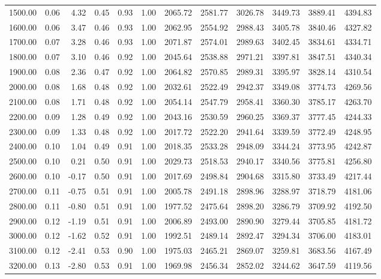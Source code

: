 \begin{table}[ht]
\begin{tabular}{rrrrrrrrrrrr}
  1500.00 & 0.06 & 4.32 & 0.45 & 0.93 & 1.00 & 2065.72 & 2581.77 & 3026.78 & 3449.73 & 3889.41 & 4394.83 \\ 
  1600.00 & 0.06 & 3.47 & 0.46 & 0.93 & 1.00 & 2062.95 & 2554.92 & 2988.43 & 3405.78 & 3840.46 & 4327.82 \\ 
  1700.00 & 0.07 & 3.28 & 0.46 & 0.93 & 1.00 & 2071.87 & 2574.01 & 2989.63 & 3402.45 & 3834.61 & 4334.71 \\ 
  1800.00 & 0.07 & 3.10 & 0.46 & 0.92 & 1.00 & 2045.64 & 2538.88 & 2971.21 & 3397.81 & 3847.51 & 4340.34 \\ 
  1900.00 & 0.08 & 2.36 & 0.47 & 0.92 & 1.00 & 2064.82 & 2570.85 & 2989.31 & 3395.97 & 3828.14 & 4310.54 \\ 
  2000.00 & 0.08 & 1.68 & 0.48 & 0.92 & 1.00 & 2032.61 & 2522.49 & 2942.37 & 3349.08 & 3774.73 & 4269.56 \\ 
  2100.00 & 0.08 & 1.71 & 0.48 & 0.92 & 1.00 & 2054.14 & 2547.79 & 2958.41 & 3360.30 & 3785.17 & 4263.70 \\ 
  2200.00 & 0.09 & 1.28 & 0.49 & 0.92 & 1.00 & 2043.16 & 2530.59 & 2960.25 & 3369.37 & 3777.45 & 4244.33 \\ 
  2300.00 & 0.09 & 1.33 & 0.48 & 0.92 & 1.00 & 2017.72 & 2522.20 & 2941.64 & 3339.59 & 3772.49 & 4248.95 \\ 
  2400.00 & 0.10 & 1.04 & 0.49 & 0.91 & 1.00 & 2018.35 & 2533.28 & 2948.09 & 3344.24 & 3773.95 & 4242.87 \\ 
  2500.00 & 0.10 & 0.21 & 0.50 & 0.91 & 1.00 & 2029.73 & 2518.53 & 2940.17 & 3340.56 & 3775.81 & 4256.80 \\ 
  2600.00 & 0.10 & -0.17 & 0.50 & 0.91 & 1.00 & 2017.69 & 2498.84 & 2904.68 & 3315.80 & 3733.49 & 4217.44 \\ 
  2700.00 & 0.11 & -0.75 & 0.51 & 0.91 & 1.00 & 2005.78 & 2491.18 & 2898.96 & 3288.97 & 3718.79 & 4181.06 \\ 
  2800.00 & 0.11 & -0.80 & 0.51 & 0.91 & 1.00 & 1977.52 & 2475.64 & 2898.20 & 3286.79 & 3709.92 & 4192.50 \\ 
  2900.00 & 0.12 & -1.19 & 0.51 & 0.91 & 1.00 & 2006.89 & 2493.00 & 2890.90 & 3279.44 & 3705.85 & 4181.72 \\ 
  3000.00 & 0.12 & -1.62 & 0.52 & 0.91 & 1.00 & 1992.51 & 2489.14 & 2892.47 & 3294.34 & 3706.00 & 4183.01 \\ 
  3100.00 & 0.12 & -2.41 & 0.53 & 0.90 & 1.00 & 1975.03 & 2465.21 & 2869.07 & 3259.81 & 3683.56 & 4167.49 \\ 
  3200.00 & 0.13 & -2.80 & 0.53 & 0.91 & 1.00 & 1969.98 & 2456.34 & 2852.02 & 3244.62 & 3647.59 & 4119.56 \\ 

\end{tabular}
\end{table}
